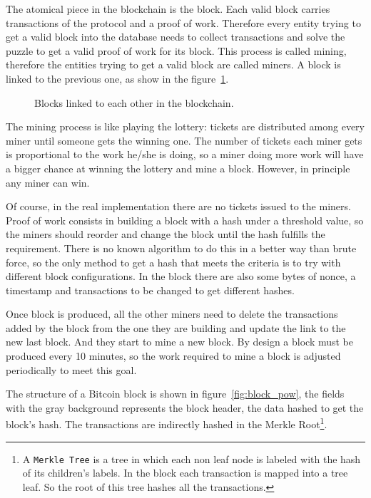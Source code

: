 The atomical piece in the blockchain is the block. Each valid block carries
  transactions of the protocol and a proof of work. Therefore every entity
  trying to get a valid block into the database needs to collect transactions
  and solve the puzzle to get a valid proof of work for its block.
This process is called mining, therefore the entities trying to get a valid
  block are called miners. A block is linked to the previous one, as show in the
  figure~\ref{fig:block_links}.

\begin{figure}
	\centering
	\def\svgwidth{\columnwidth}
	
	\caption{Blocks linked to each other in the blockchain.}
	\label{fig:block_links}
\end{figure}

The mining process is like playing the lottery: tickets are distributed  among
  every miner until someone gets the winning one. The number of tickets each
  miner gets is proportional to the work he/she is doing, so a miner doing more
  work will have a bigger chance at winning the lottery and mine a block.
However, in principle any miner can win.

Of course, in the real implementation there are no tickets issued to the
  miners.
Proof of work consists in building a block with a hash under a threshold value,
  so the miners should reorder and change the block until the hash fulfills the
  requirement.
There is no known algorithm to do this in a better way than brute force, so the
  only method to get a hash that meets the criteria is to try with different
  block configurations. In the block there are also some bytes of nonce, a
  timestamp and transactions to be changed to get different hashes.

Once block is produced, all the other miners need to delete the transactions
  added by the block from the one they are building and update the link to the
  new last block. And they start to mine a new block.
By design a block must be produced every 10 minutes, so the work required to
  mine a block is adjusted periodically to meet this goal.

The structure of a Bitcoin block is shown in figure~\ref{fig:block_pow}, the
  fields with the gray background represents the block header, the data hashed
  to get the block's hash.
The transactions are indirectly hashed in the Merkle Root\footnote{A
  \texttt{Merkle Tree} is a tree in which each non leaf node is labeled with
  the hash of its children's labels. In the block each transaction is mapped
  into a tree leaf. So the root of this tree hashes all the transactions.}.

